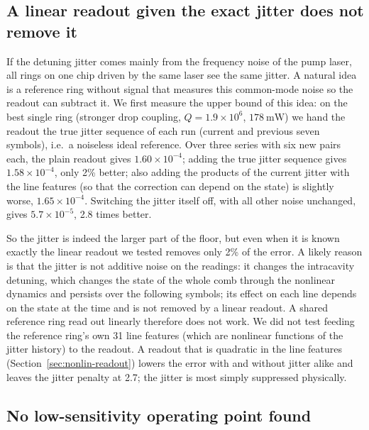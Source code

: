 \subsection{A linear readout given the exact jitter does not remove it}\label{sec:reference}

If the detuning jitter comes mainly from the frequency noise of the pump laser, all rings on one chip driven by the same laser see
the same jitter. A natural idea is a reference ring without signal that measures this common-mode noise so the readout can subtract
it. We first measure the upper bound of this idea: on the best single ring (stronger drop coupling, $Q=1.9\times10^{6}$,
$178~\mathrm{mW}$) we hand the readout the true jitter sequence of each run (current and previous seven symbols), i.e.\ a noiseless
ideal reference. Over three series with six new pairs each, the plain readout gives $1.60\times10^{-4}$; adding the true jitter
sequence gives $1.58\times10^{-4}$, only 2\% better; also adding the products of the current jitter with the line features (so that
the correction can depend on the state) is slightly worse, $1.65\times10^{-4}$. Switching the jitter itself off, with all other
noise unchanged, gives $5.7\times10^{-5}$, 2.8 times better.

So the jitter is indeed the larger part of the floor, but even when it is known exactly the linear readout we tested removes only
2\% of the error. A likely reason is that the jitter is not additive noise on the readings: it changes the intracavity detuning, which changes the state of
the whole comb through the nonlinear dynamics and persists over the following symbols; its effect on each line depends on the state
at the time and is not removed by a linear readout. A shared reference ring read out linearly therefore does not work. We
did not test feeding the reference ring's own 31 line features (which are nonlinear functions of the jitter history) to the
readout. A readout that is quadratic in the line features (Section~\ref{sec:nonlin-readout}) lowers the error with and without
jitter alike and leaves the jitter penalty at 2.7; the jitter is most simply suppressed physically.

\subsection{No low-sensitivity operating point found}\label{sec:sweetspot}

